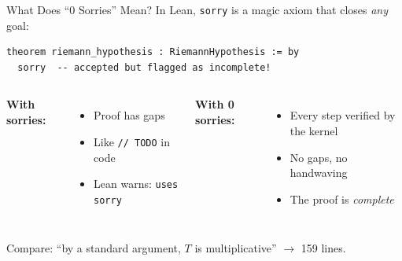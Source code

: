 \documentclass[aspectratio=169,10pt]{beamer}
\begin{document}
\begin{frame}[fragile]{What Does ``0 Sorries'' Mean?}
In Lean, \texttt{sorry} is a magic axiom that closes \emph{any} goal:

\vspace{0.3em}
\begin{lstlisting}
theorem riemann_hypothesis : RiemannHypothesis := by
  sorry  -- accepted but flagged as incomplete!
\end{lstlisting}

\vspace{0.4em}
\begin{columns}[T]
\textbf{\textcolor{softred}{With sorries:}}
\begin{itemize}
  \item Proof has gaps
  \item Like \texttt{// TODO} in code
  \item Lean warns: \textcolor{amber}{\texttt{uses sorry}}
\end{itemize}

\textbf{\textcolor{leangreen}{With 0 sorries:}}
\begin{itemize}
  \item Every step verified by the kernel
  \item No gaps, no handwaving
  \item The proof is \emph{complete}
\end{itemize}
\end{columns}

\vspace{0.6em}
\begin{center}
\end{center}

\vspace{0.3em}
{\small Compare: ``by a standard argument, $T$ is multiplicative'' $\to$ 159 lines.}
\end{frame}
\end{document}
